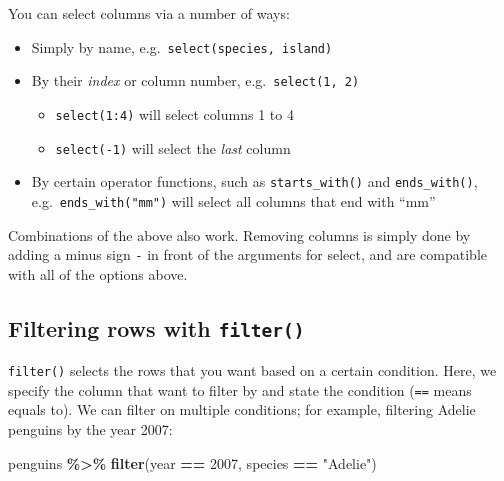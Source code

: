\documentclass[
]{book}
\newenvironment{Shaded}{\begin{snugshade}}{\end{snugshade}}
\newcommand{\DecValTok}[1]{\textcolor[rgb]{0.00,0.00,0.81}{#1}}
\newcommand{\FunctionTok}[1]{\textcolor[rgb]{0.13,0.29,0.53}{\textbf{#1}}}
\newcommand{\NormalTok}[1]{#1}
\newcommand{\SpecialCharTok}[1]{\textcolor[rgb]{0.81,0.36,0.00}{\textbf{#1}}}
\newcommand{\StringTok}[1]{\textcolor[rgb]{0.31,0.60,0.02}{#1}}
\providecommand{\tightlist}{%
  \setlength{\itemsep}{0pt}\setlength{\parskip}{0pt}}
\begin{document}
You can select columns via a number of ways:

\begin{itemize}
\tightlist
\item
  Simply by name, e.g.~\texttt{select(species,\ island)}
\item
  By their \emph{index} or column number, e.g.~\texttt{select(1,\ 2)}

  \begin{itemize}
  \tightlist
  \item
    \texttt{select(1:4)} will select columns 1 to 4
  \item
    \texttt{select(-1)} will select the \emph{last} column
  \end{itemize}
\item
  By certain operator functions, such as \texttt{starts\_with()} and \texttt{ends\_with()}, e.g.~\texttt{ends\_with("mm")} will select all columns that end with ``mm''
\end{itemize}

Combinations of the above also work. Removing columns is simply done by adding a minus sign \texttt{-} in front of the arguments for select, and are compatible with all of the options above.

\hypertarget{filtering-rows-with-filter}{%
\subsection{\texorpdfstring{Filtering rows with \texttt{filter()}}{Filtering rows with filter()}}\label{filtering-rows-with-filter}}

\texttt{filter()} selects the rows that you want based on a certain condition. Here, we specify the column that want to filter by and state the condition (\texttt{==} means equals to). We can filter on multiple conditions; for example, filtering Adelie penguins by the year 2007:

\begin{Shaded}
\begin{Highlighting}[]
\NormalTok{penguins }\SpecialCharTok{\%\textgreater{}\%}
  \FunctionTok{filter}\NormalTok{(year }\SpecialCharTok{==} \DecValTok{2007}\NormalTok{, species }\SpecialCharTok{==} \StringTok{"Adelie"}\NormalTok{)}
\end{Highlighting}
\end{Shaded}
\end{document}
